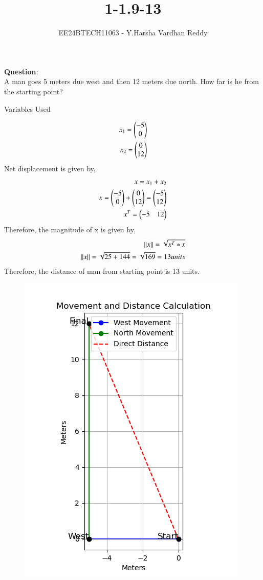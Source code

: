 \documentclass[journal]{IEEEtran}
\begin{document}

\vspace{3cm}

\title{1-1.9-13}
\author{EE24BTECH11063 - Y.Harsha Vardhan Reddy
}
{\let\newpage\relax\maketitle}

\renewcommand{\thefigure}{\theenumi}
\renewcommand{\thetable}{\theenumi}
\setlength{\intextsep}{10pt} %


\renewcommand{\thetable}{\theenumi}
\textbf{Question}:\\
A man goes 5 meters due west and then 12 meters due north. How far is he from the starting point?
\\
\solution
\begin{table}[h!]    
  \centering
  
  \caption{Variables Used}
  \label{tab1-1.2-20}
\end{table}
\begin{align}
x_1=\begin{pmatrix}-5\\0\end{pmatrix} \\
x_2=\begin{pmatrix}0\\12\end{pmatrix}
\end{align}
Net displacement is given by,
\begin{align}
x=x_1 + x_2\\
x=\begin{pmatrix}-5\\0\end{pmatrix}+\begin{pmatrix}0\\12\end{pmatrix}=\begin{pmatrix}-5\\12\end{pmatrix}\\
    x^T=\begin{pmatrix}-5 & 12\end{pmatrix}
\end{align}
Therefore, the magnitude of x is given by,
\begin{align}
    \left\lVert x\right\rVert=\sqrt{x^T * x}\\
    \left\lVert x\right\rVert=\sqrt{25+144}=\sqrt{169}=13 units
\end{align}
Therefore, the distance of man from starting point is 13 units.
\begin{figure}[h!]
   \centering
   \includegraphics[width=0.7\linewidth]{figure_1.png}
   \label{stemplot}
\end{figure}
\end{document}
